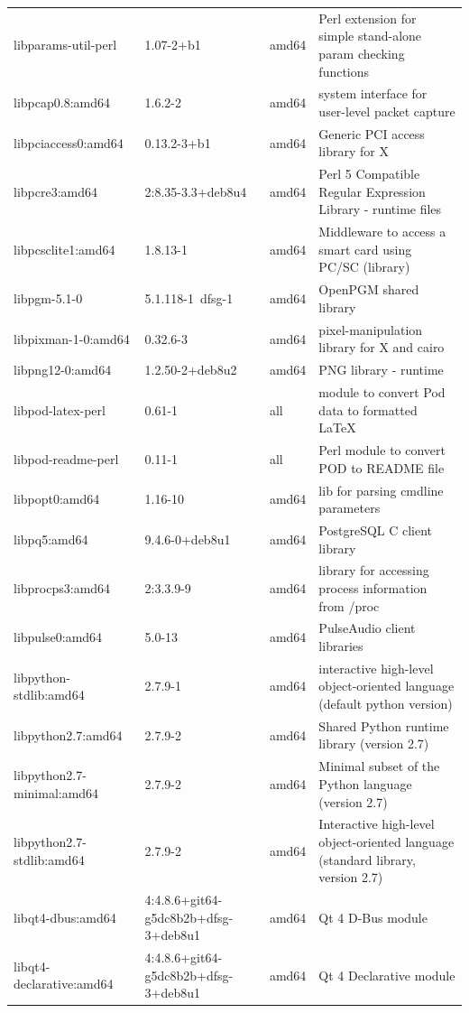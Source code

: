\documentclass[a4paper,10pt]{article}
\begin{document}
\begin{appendices}
{\begin{longtable}{p{3.25cm}@{\hspace{0.25cm}}p{4cm}@{\hspace{0.25cm}}l@{\hspace{0.25cm}}p{7cm}}
libparams-util-perl	&	1.07-2+b1	&	amd64	&	Perl extension for simple stand-alone param checking functions	\\
libpcap0.8:amd64	&	1.6.2-2	&	amd64	&	system interface for user-level packet capture	\\
libpciaccess0:amd64	&	0.13.2-3+b1	&	amd64	&	Generic PCI access library for X	\\
libpcre3:amd64	&	2:8.35-3.3+deb8u4	&	amd64	&	Perl 5 Compatible Regular Expression Library - runtime files	\\
libpcsclite1:amd64	&	1.8.13-1	&	amd64	&	Middleware to access a smart card using PC/SC (library)	\\
libpgm-5.1-0	&	5.1.118-1~dfsg-1	&	amd64	&	OpenPGM shared library	\\
libpixman-1-0:amd64	&	0.32.6-3	&	amd64	&	pixel-manipulation library for X and cairo	\\
libpng12-0:amd64	&	1.2.50-2+deb8u2	&	amd64	&	PNG library - runtime	\\
libpod-latex-perl	&	0.61-1	&	all	&	module to convert Pod data to formatted LaTeX	\\
libpod-readme-perl	&	0.11-1	&	all	&	Perl module to convert POD to README file	\\
libpopt0:amd64	&	1.16-10	&	amd64	&	lib for parsing cmdline parameters	\\
libpq5:amd64	&	9.4.6-0+deb8u1	&	amd64	&	PostgreSQL C client library	\\
libprocps3:amd64	&	2:3.3.9-9	&	amd64	&	library for accessing process information from /proc	\\
libpulse0:amd64	&	5.0-13	&	amd64	&	PulseAudio client libraries	\\
libpython-stdlib:amd64	&	2.7.9-1	&	amd64	&	interactive high-level object-oriented language (default python version)	\\
libpython2.7:amd64	&	2.7.9-2	&	amd64	&	Shared Python runtime library (version 2.7)	\\
libpython2.7-minimal:amd64	&	2.7.9-2	&	amd64	&	Minimal subset of the Python language (version 2.7)	\\
libpython2.7-stdlib:amd64	&	2.7.9-2	&	amd64	&	Interactive high-level object-oriented language (standard library, version 2.7)	\\
libqt4-dbus:amd64	&	4:4.8.6+git64-g5dc8b2b+dfsg-3+deb8u1	&	amd64	&	Qt 4 D-Bus module	\\
libqt4-declarative:amd64	&	4:4.8.6+git64-g5dc8b2b+dfsg-3+deb8u1	&	amd64	&	Qt 4 Declarative module	\\

\end{longtable}}
\end{appendices}
\end{document}

